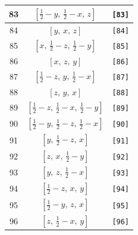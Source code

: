 \documentclass[fleqn,8pt]{jsarticle}
\begin{document}
\begin{longtable}{ccc}
83 & $\left[ \frac{1}{2} - y,\, \frac{1}{2} - x,\, z \right]$ & {\tt [83]} \\ \hline
84 & $\left[ y,\, x,\, z \right]$ & {\tt [84]} \\ \hline
85 & $\left[ x,\, \frac{1}{2} - z,\, \frac{1}{2} - y \right]$ & {\tt [85]} \\ \hline
86 & $\left[ x,\, z,\, y \right]$ & {\tt [86]} \\ \hline
87 & $\left[ \frac{1}{2} - z,\, y,\, \frac{1}{2} - x \right]$ & {\tt [87]} \\ \hline
88 & $\left[ z,\, y,\, x \right]$ & {\tt [88]} \\ \hline
89 & $\left[ \frac{1}{2} - z,\, \frac{1}{2} - x,\, \frac{1}{2} - y \right]$ & {\tt [89]} \\ \hline
90 & $\left[ \frac{1}{2} - y,\, \frac{1}{2} - z,\, \frac{1}{2} - x \right]$ & {\tt [90]} \\ \hline
91 & $\left[ y,\, \frac{1}{2} - z,\, x \right]$ & {\tt [91]} \\ \hline
92 & $\left[ z,\, x,\, \frac{1}{2} - y \right]$ & {\tt [92]} \\ \hline
93 & $\left[ y,\, z,\, \frac{1}{2} - x \right]$ & {\tt [93]} \\ \hline
94 & $\left[ \frac{1}{2} - z,\, x,\, y \right]$ & {\tt [94]} \\ \hline
95 & $\left[ \frac{1}{2} - y,\, z,\, x \right]$ & {\tt [95]} \\ \hline
96 & $\left[ z,\, \frac{1}{2} - x,\, y \right]$ & {\tt [96]} \\
\end{longtable}
\end{document}
